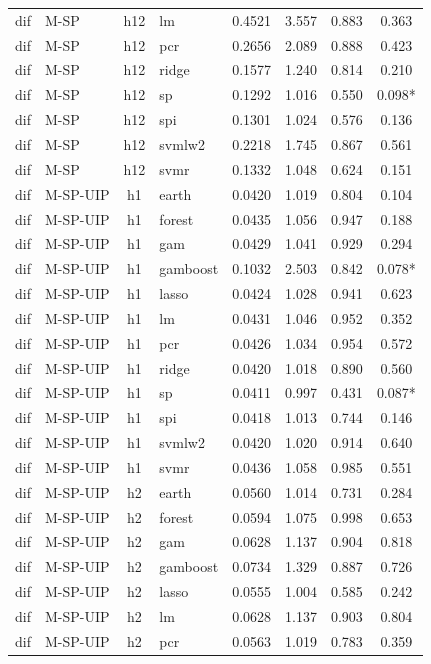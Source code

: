\begin{ThreePartTable}
\begin{longtable}[t]{llclcccc}
dif & M-SP & h12 & lm & 0.4521 & 3.557 & 0.883 & 0.363\\
dif & M-SP & h12 & pcr & 0.2656 & 2.089 & 0.888 & 0.423\\
dif & M-SP & h12 & ridge & 0.1577 & 1.240 & 0.814 & 0.210\\
dif & M-SP & h12 & sp & 0.1292 & 1.016 & 0.550 & 0.098*\\
dif & M-SP & h12 & spi & 0.1301 & 1.024 & 0.576 & 0.136\\
dif & M-SP & h12 & svmlw2 & 0.2218 & 1.745 & 0.867 & 0.561\\
dif & M-SP & h12 & svmr & 0.1332 & 1.048 & 0.624 & 0.151\\
\addlinespace
dif & M-SP-UIP & h1 & earth & 0.0420 & 1.019 & 0.804 & 0.104\\
dif & M-SP-UIP & h1 & forest & 0.0435 & 1.056 & 0.947 & 0.188\\
dif & M-SP-UIP & h1 & gam & 0.0429 & 1.041 & 0.929 & 0.294\\
dif & M-SP-UIP & h1 & gamboost & 0.1032 & 2.503 & 0.842 & 0.078*\\
dif & M-SP-UIP & h1 & lasso & 0.0424 & 1.028 & 0.941 & 0.623\\
dif & M-SP-UIP & h1 & lm & 0.0431 & 1.046 & 0.952 & 0.352\\
dif & M-SP-UIP & h1 & pcr & 0.0426 & 1.034 & 0.954 & 0.572\\
dif & M-SP-UIP & h1 & ridge & 0.0420 & 1.018 & 0.890 & 0.560\\
dif & M-SP-UIP & h1 & sp & 0.0411 & 0.997 & 0.431 & 0.087*\\
dif & M-SP-UIP & h1 & spi & 0.0418 & 1.013 & 0.744 & 0.146\\
dif & M-SP-UIP & h1 & svmlw2 & 0.0420 & 1.020 & 0.914 & 0.640\\
dif & M-SP-UIP & h1 & svmr & 0.0436 & 1.058 & 0.985 & 0.551\\
\addlinespace
dif & M-SP-UIP & h2 & earth & 0.0560 & 1.014 & 0.731 & 0.284\\
dif & M-SP-UIP & h2 & forest & 0.0594 & 1.075 & 0.998 & 0.653\\
dif & M-SP-UIP & h2 & gam & 0.0628 & 1.137 & 0.904 & 0.818\\
dif & M-SP-UIP & h2 & gamboost & 0.0734 & 1.329 & 0.887 & 0.726\\
dif & M-SP-UIP & h2 & lasso & 0.0555 & 1.004 & 0.585 & 0.242\\
dif & M-SP-UIP & h2 & lm & 0.0628 & 1.137 & 0.903 & 0.804\\
dif & M-SP-UIP & h2 & pcr & 0.0563 & 1.019 & 0.783 & 0.359\\

\end{longtable}
\end{ThreePartTable}
